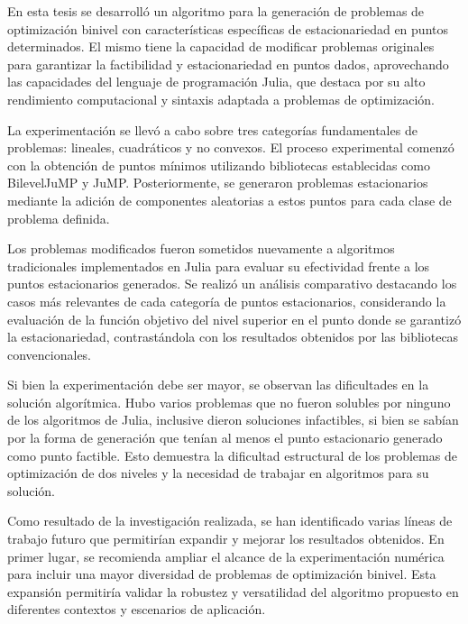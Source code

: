 \begin{conclusions}
    

    En esta tesis se desarrolló un algoritmo para la generación de problemas de optimización binivel con características específicas de estacionariedad en puntos determinados. El mismo tiene la capacidad de modificar problemas originales para garantizar la factibilidad y estacionariedad en puntos dados, aprovechando las capacidades del lenguaje de programación Julia, que destaca por su alto rendimiento computacional y sintaxis adaptada a problemas de optimización.
    
    La experimentación se llevó a cabo sobre tres categorías fundamentales de problemas: lineales, cuadráticos y no convexos. El proceso experimental comenzó con la obtención de puntos mínimos utilizando bibliotecas establecidas como BilevelJuMP y JuMP. Posteriormente, se generaron problemas estacionarios mediante la adición de componentes aleatorias a estos puntos para cada clase de problema definida.
    
    Los problemas modificados fueron sometidos nuevamente a algoritmos tradicionales implementados en Julia para evaluar su efectividad frente a los puntos estacionarios generados. Se realizó un análisis comparativo destacando los casos más relevantes de cada categoría de puntos estacionarios, considerando la evaluación de la función objetivo del nivel superior en el punto donde se garantizó la estacionariedad, contrastándola con los resultados obtenidos por las bibliotecas convencionales.
    
Si bien la experimentación debe ser mayor, se observan las dificultades en la solución algorítmica. Hubo varios problemas que no fueron solubles por ninguno de los algoritmos de Julia, inclusive dieron soluciones infactibles, si bien se sabían por la forma de generación que tenían al menos el punto estacionario generado como punto factible.
Esto demuestra la dificultad estructural de los problemas de optimización de dos niveles y la necesidad de trabajar en algoritmos para su solución.



Como resultado de la investigación realizada, se han identificado varias líneas de trabajo futuro que permitirían expandir y mejorar los resultados obtenidos. En primer lugar, se recomienda ampliar el alcance de la experimentación numérica para incluir una mayor diversidad de problemas de optimización binivel. Esta expansión permitiría validar la robustez y versatilidad del algoritmo propuesto en diferentes contextos y escenarios de aplicación.
    

\end{conclusions}
